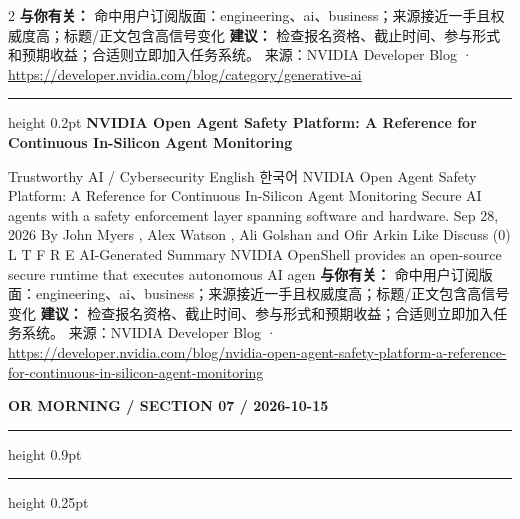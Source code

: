 \documentclass[10.5pt]{ctexart}
\begin{document}
\begin{multicols}{2}
\textbf{与你有关：} 命中用户订阅版面：engineering、ai、business；来源接近一手且权威度高；标题/正文包含高信号变化
\textbf{建议：} 检查报名资格、截止时间、参与形式和预期收益；合适则立即加入任务系统。
{\footnotesize\color{ormuted} 来源：NVIDIA Developer Blog · \url{https://developer.nvidia.com/blog/category/generative-ai}}
\vspace{2mm}
\hrule height 0.2pt
\vspace{2mm}
{\large\bfseries NVIDIA Open Agent Safety Platform: A Reference for Continuous In-Silicon Agent Monitoring}\par
Trustworthy AI / Cybersecurity English 한국어 NVIDIA Open Agent Safety Platform: A Reference for Continuous In-Silicon Agent Monitoring Secure AI agents with a safety enforcement layer spanning software and hardware. Sep 28, 2026 By John Myers , Alex Watson , Ali Golshan and Ofir Arkin Like Discuss (0) L T F R E AI-Generated Summary NVIDIA OpenShell provides an open-source secure runtime that executes autonomous AI agen
\textbf{与你有关：} 命中用户订阅版面：engineering、ai、business；来源接近一手且权威度高；标题/正文包含高信号变化
\textbf{建议：} 检查报名资格、截止时间、参与形式和预期收益；合适则立即加入任务系统。
{\footnotesize\color{ormuted} 来源：NVIDIA Developer Blog · \url{https://developer.nvidia.com/blog/nvidia-open-agent-safety-platform-a-reference-for-continuous-in-silicon-agent-monitoring}}
\end{multicols}
\newpage
{\small\bfseries OR MORNING / SECTION 07 / 2026-10-15}
\vspace{2mm}
\hrule height 0.9pt
\vspace{1.5mm}
\hrule height 0.25pt
\vspace{4mm}
\end{document}
